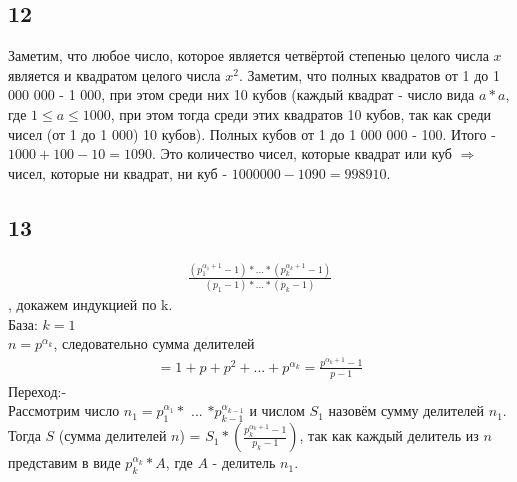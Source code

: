 		\subsection{12}
		Заметим, что любое число, которое является четвёртой степенью целого числа $x$ является и квадратом целого числа $x^2$. Заметим, что полных квадратов от 1 до 1 000 000 - 1 000, при этом среди них 10 кубов (каждый квадрат - число вида $a*a$, где $1 \leqslant a \leqslant 1000$, при этом тогда среди этих квадратов 10 кубов, так как среди чисел (от 1 до 1 000) 10 кубов). Полных кубов от 1 до 1 000 000 - 100. Итого - $1 000 + 100 - 10 = 1 090$. Это количество чисел, которые квадрат или куб $\Rightarrow$ чисел, которые ни квадрат, ни куб - $1 000 000 - 1 090 = 998 910$.
		
		
		\subsection{13}
		\begin{gather*}
		\frac{(p_1^{\alpha_1 + 1} - 1) * ... * (p_k^{\alpha_k + 1} - 1)}{(p_1 - 1) * ... * (p_k - 1)}
		\end{gather*}
		, докажем индукцией по k.\\
		База: $k = 1$\\
		$n = p^{\alpha_k}$, следовательно сумма делителей 
		\begin{gather*}
		= 1 + p + p^2 + ... + p^{\alpha_k} = \frac{p^{\alpha_k + 1} - 1}{p - 1}
		\end{gather*}
		Переход:-\\
		Рассмотрим число $n_1 = p_1^{\alpha_1} * $ ... $ * p_{k-1}^{\alpha_{k-1}}$ и числом $S_1$ назовём сумму делителей $n_1$. Тогда $S$ (сумма делителей $n$) = $S_1*(\frac{p_k^{\alpha_k + 1} - 1}{p_k - 1})$, так как каждый делитель из $n$ представим в виде $p_k^{\alpha _k}*A$, где $A$ - делитель $n_1$.
			
		
